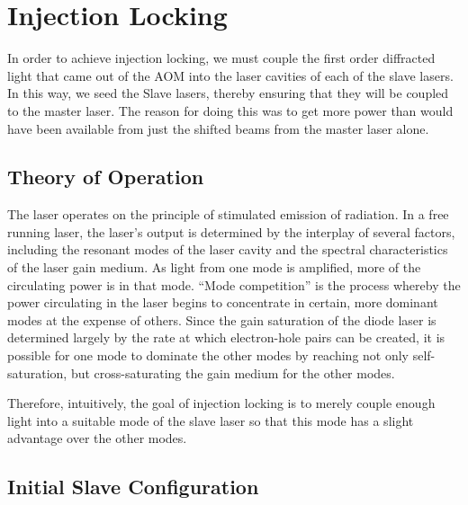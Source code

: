  \chapter{Injection Locking}\label{InjectionLockingChapter}


In order to achieve injection locking, we must couple the first order diffracted light that came out of the AOM into the laser cavities of each of the slave lasers. In this way, we seed the Slave lasers, thereby ensuring that they will be coupled to the master laser. 
The reason for doing this was to get more power than would have been available from just the shifted beams from the master laser alone. 

\section{Theory of Operation}


The laser operates on the principle of stimulated emission of radiation. In a free running laser, the laser's output is determined by the interplay of several factors, including the resonant modes of the laser cavity and the spectral characteristics of the laser gain medium. As light from one mode is amplified, more of the circulating power is in that mode. 
``Mode competition'' is the process whereby the power circulating in the laser begins to concentrate in certain, more dominant modes at the expense of others. Since the gain saturation of the diode laser is determined largely by the rate at which electron-hole pairs can be created, it is possible for one mode to dominate the other modes by reaching not only self-saturation, but cross-saturating the gain medium for the other modes\cite{RPPhotonicsEncyclopediaAndBuyersGuide}.

Therefore, intuitively, the goal of injection locking is to merely couple enough light into a suitable mode of the slave laser so that this mode has a slight advantage over the other modes. 

\section{Initial Slave Configuration}
\label{initialSlaveConfiguration}


